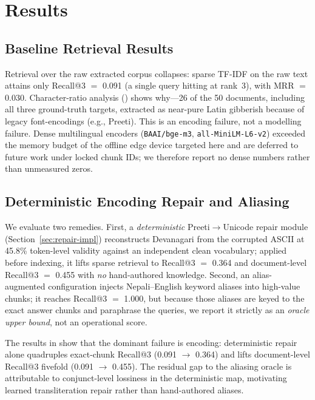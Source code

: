 \chapter{Results}
\label{ch:results}

\section{Baseline Retrieval Results}
Retrieval over the raw extracted corpus collapses: sparse TF-IDF on the raw text attains only Recall@3 $=$ 0.091 (a single query hitting at rank~3), with MRR $=$ 0.030. Character-ratio analysis () shows why---26 of the 50 documents, including all three ground-truth targets, extracted as near-pure Latin gibberish because of legacy font-encodings (e.g., Preeti). This is an encoding failure, not a modelling failure. Dense multilingual encoders (\texttt{BAAI/bge-m3}, \texttt{all-MiniLM-L6-v2}) exceeded the memory budget of the offline edge device targeted here and are deferred to future work under locked chunk IDs; we therefore report no dense numbers rather than unmeasured zeros.

\section{Deterministic Encoding Repair and Aliasing}
We evaluate two remedies. First, a \emph{deterministic} Preeti$\rightarrow$Unicode repair module (Section~\ref{sec:repair-impl}) reconstructs Devanagari from the corrupted ASCII at 45.8\% token-level validity against an independent clean vocabulary; applied before indexing, it lifts sparse retrieval to Recall@3 $=$ 0.364 and document-level Recall@3 $=$ 0.455 with \emph{no} hand-authored knowledge. Second, an alias-augmented configuration injects Nepali--English keyword aliases into high-value chunks; it reaches Recall@3 $=$ 1.000, but because those aliases are keyed to the exact answer chunks and paraphrase the queries, we report it strictly as an \emph{oracle upper bound}, not an operational score.

\begin{table}[H]
  \centering
  \caption{Retrieval metrics on the 11-query code-switched bank ($k{=}3$). The aliased row is an oracle upper bound (query leakage). Numbers are generated by \texttt{thesis/code/paper\_analysis.py}.}
  \label{tab:baseline-results}
  \small
  
\end{table}

The results in  show that the dominant failure is encoding: deterministic repair alone quadruples exact-chunk Recall@3 (0.091 $\rightarrow$ 0.364) and lifts document-level Recall@3 fivefold (0.091 $\rightarrow$ 0.455). The residual gap to the aliasing oracle is attributable to conjunct-level lossiness in the deterministic map, motivating learned transliteration repair rather than hand-authored aliases.


